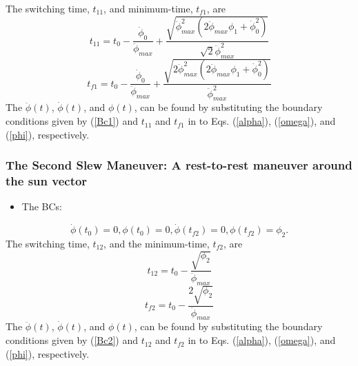 \documentclass[letterpaper, preprint, paper,11pt]{AAS}	%
\begin{document}
			The switching time, $t_{11}$, and minimum-time, $t_{f1}$, are
			\begin{equation}\label{t11}
			t_{11}=t_0-\frac{\dot{\phi}_0}{\ddot{\phi}_{max}}+\frac{\sqrt{\ddot{\phi}_{max}^2(2\ddot{\phi}_{max}\phi_1+\dot{\phi}_{0}^2)}}{\sqrt{2}\ddot{\phi}_{max}^2}
			\end{equation}
			\begin{equation}\label{tf1}
			t_{f1}=t_0-\frac{\dot{\phi}_0}{\ddot{\phi}_{max}}+\frac{\sqrt{2\ddot{\phi}_{max}^2(2\ddot{\phi}_{max}\phi_1+\dot{\phi}_{0}^2)}}{\ddot{\phi}_{max}^2}
			\end{equation}
			The $\ddot{\phi}(t)$, $\dot{\phi}(t)$, and  $\phi(t)$,  can be found by substituting the boundary conditions given by (\ref{Bc1}) and $t_{11}$ and $t_{f1}$ in to Eqs. (\ref{alpha}), (\ref{omega}), and (\ref{phi}), respectively.
			

			\subsubsection{The Second Slew Maneuver: A rest-to-rest maneuver around the sun vector} 
			
			\begin{itemize}
				\item The BCs: 
			\end{itemize}
			\begin{equation}\label{Bc2}
			\dot{\phi}(t_0)=0,\phi(t_0)=0, \dot{\phi}(t_{f2})=0,\phi(t_{f2})=\phi_2.
			\end{equation}
			The switching time, $t_{12}$, and the minimum-time, $t_{f2}$, are
			\begin{equation}\label{t21}
			t_{12}=t_0-\frac{\sqrt{\phi_2}}{\ddot{\phi}_{max}}
			\end{equation}
			\begin{equation}\label{tf2}
			t_{f2}=t_0-\frac{2\sqrt{\phi_2}}{\ddot{\phi}_{max}}
			\end{equation}
			The $\ddot{\phi}(t)$, $\dot{\phi}(t)$, and  $\phi(t)$,  can be found by substituting the boundary conditions given by (\ref{Bc2}) and $t_{12}$ and $t_{f2}$ in to Eqs. (\ref{alpha}), (\ref{omega}), and (\ref{phi}), respectively.
			
\end{document}
